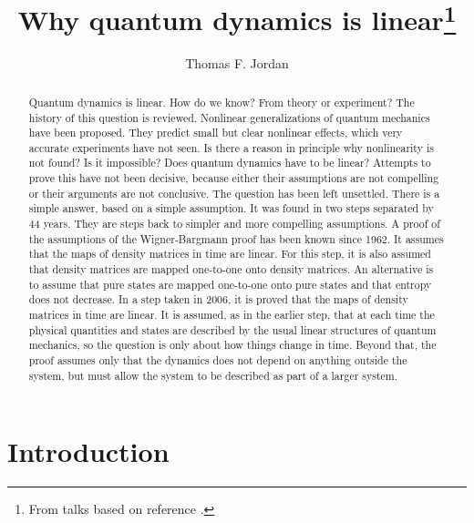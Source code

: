 \documentclass[pra, 12pt, showkeys, eqsecnum]{revtex4}
\begin{document}
\title{Why quantum dynamics is linear\footnote[2]{From talks based on reference \cite{me80}.}}
\author{Thomas F. Jordan}
 

\begin{abstract}
Quantum dynamics is linear. How do we know? From theory or experiment? The history of this question is reviewed. Nonlinear generalizations of quantum mechanics have been proposed. They predict small but clear nonlinear effects, which very accurate experiments have not seen. Is there a reason in principle why nonlinearity is not found? Is it impossible? Does quantum dynamics have to be linear? Attempts to prove this have not been decisive, because either their assumptions are not compelling or their arguments are not conclusive. The question has been left unsettled. There is a simple answer, based on a simple assumption. It was found in two steps separated by 44 years.
They are steps back to simpler and more compelling assumptions. A proof of the assumptions of the Wigner-Bargmann proof has been known since 1962. It assumes that the maps of density matrices in time are linear. For this step, it is also assumed that density matrices are mapped one-to-one onto density matrices. An alternative is to assume that pure states are mapped one-to-one onto pure states and that entropy does not decrease. In a step taken in 2006, it is proved that the maps of density matrices in time are linear. It is assumed, as in the earlier step, that at each time the physical quantities and states are described by the usual linear structures of quantum mechanics, so the question is only about how things change in time. Beyond that, the proof assumes only that the dynamics does not depend on anything outside the system, but must allow the system to be described as part of a larger system.

\end{abstract}


\maketitle

\newpage

\section{Introduction}\label{one}
\end{document}
